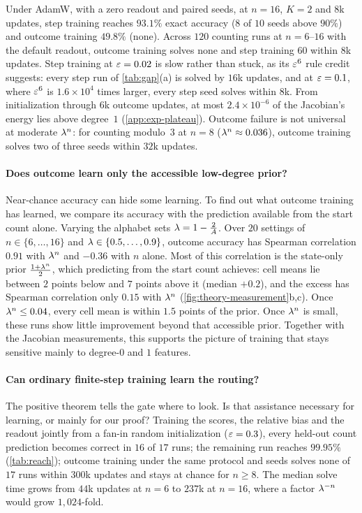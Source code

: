 Under AdamW, with a zero readout and paired seeds, at $n=16$, $K=2$ and $8$k updates, step training reaches
$93.1\%$ exact accuracy ($8$ of $10$ seeds above $90\%$) and outcome training $49.8\%$ (none). Across $120$ counting runs at
$n=6$--$16$ with the default readout, outcome training solves none and step training $60$ within $8$k updates. Step
training at $\varepsilon=0.02$ is slow rather than stuck, as its $\varepsilon^6$ rule credit suggests: every step run of
\cref{tab:gap}(a) is solved by $16$k updates, and at $\varepsilon=0.1$, where $\varepsilon^6$ is $1.6\times10^4$ times larger, every
step seed solves within $8$k. From initialization through $6$k outcome updates, at most $2.4\times10^{-6}$ of the Jacobian's
energy lies above degree~$1$ (\cref{app:exp-plateau}). Outcome failure is not universal at moderate $\lambda^n$: for counting
modulo~$3$ at $n=8$ ($\lambda^n\approx0.036$), outcome training solves two of three seeds within $32$k updates.

\paragraph{Does outcome learn only the accessible low-degree prior?} Near-chance accuracy can hide some learning. To find out what
outcome training has learned, we compare its accuracy with the prediction available from the start count alone. Varying the alphabet sets $\lambda=1-\frac{2}{A}$. Over $20$ settings
of $n\in\{6,\ldots,16\}$ and $\lambda\in\{0.5,\ldots,0.9\}$, outcome accuracy has Spearman correlation $0.91$ with
$\lambda^n$ and $-0.36$ with $n$ alone. Most of this correlation is the state-only prior $\frac{1+\lambda^n}{2}$, which predicting
from the start count achieves: cell means lie between $2$ points below and $7$ points above it (median $+0.2$), and the excess
has Spearman correlation only $0.15$ with $\lambda^n$ (\cref{fig:theory-measurement}b,c). Once $\lambda^n\le0.04$, every
cell mean is within $1.5$ points of the prior. Once $\lambda^n$ is small, these runs show little improvement beyond that accessible prior. Together with the Jacobian measurements,
this supports the picture of training that stays sensitive mainly to degree-$0$ and $1$ features.

\paragraph{Can ordinary finite-step training learn the routing?} The positive theorem tells the gate where to look. Is that assistance
necessary for learning, or mainly for our proof? Training the scores, the relative bias and the readout jointly from a fan-in
random initialization ($\varepsilon=0.3$), every held-out count prediction becomes correct in $16$ of $17$ runs; the
remaining run reaches $99.95\%$ (\cref{tab:reach}); outcome training under the same protocol and seeds solves none of $17$
runs within $300$k updates and stays at chance for $n\ge8$. The median solve time grows from $44$k updates at $n=6$ to $237$k at
$n=16$, where a factor $\lambda^{-n}$ would grow $1{,}024$-fold.

